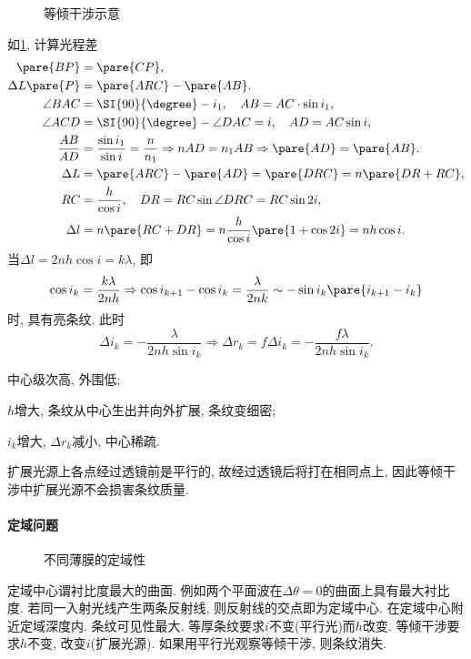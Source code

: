 \documentclass{ctexart}
\begin{document}
\begin{figure}[ht]
    \centering
    \caption{等倾干涉示意}
    \label{fig:等倾干涉示意}
\end{figure}
如\cref{fig:等倾干涉示意}, 计算光程差
\begin{align*}
    \pare{BP} &= \pare{CP}, \\
    \Delta L\pare{P} &= \pare{ARC} - \pare{AB}. \\
    \angle BAC &= \SI{90}{\degree} - i_1,\quad AB = AC\cdot\sin i_1,\\
    \angle ACD &= \SI{90}{\degree} - \angle DAC = i,\quad AD = AC\sin i, \\
    \frac{AB}{AD} &= \frac{\sin i_1}{\sin i} = \frac{n}{n_1}\Rightarrow nAD = n_1 AB \Rightarrow \pare{AD} = \pare{AB}. \\
    \Delta L &= \pare{ARC} - \pare{AD} = \pare{DRC} = n\pare{DR+RC},\\
    RC &= \frac{h}{\cos i},\quad DR = RC \sin \angle DRC = RC\sin 2i, \\
    \Delta l &= n\pare{RC + DR} = n\frac{h}{\cos i}\pare{1+\cos 2i} = nh\cos i.
\end{align*}
当$\Delta l = 2nh\cos i = k\lambda$, 即
\[ \cos i_k = \frac{k\lambda}{2nh} \Rightarrow \cos i_{k+1} - \cos i_k = \frac{\lambda}{2nk} \sim -\sin i_k \pare{i_{k+1} - i_k} \]
时, 具有亮条纹. 此时
\[ \Delta i_k = -\frac{\lambda}{2nh \sin i_k} \Rightarrow \Delta r_k = f\Delta i_k = -\frac{f\lambda}{2nh\sin i_k}. \]
\begin{cenum}
    \item 中心级次高, 外围低;
    \item $h$增大, 条纹从中心生出并向外扩展, 条纹变细密;
    \item $i_k$增大, $\Delta r_k$减小, 中心稀疏.
\end{cenum}
扩展光源上各点经过透镜前是平行的, 故经过透镜后将打在相同点上, 因此等倾干涉中扩展光源不会损害条纹质量.

\paragraph{定域问题} %
\label{par:定域问题}

\begin{figure}[ht]
    \centering
    \caption{不同薄膜的定域性}
\end{figure}
定域中心谓衬比度最大的曲面. 例如两个平面波在$\Delta\theta=0$的曲面上具有最大衬比度. 若同一入射光线产生两条反射线, 则反射线的交点即为定域中心. 在定域中心附近定域深度内. 条纹可见性最大. 等厚条纹要求$i$不变(平行光)而$h$改变. 等倾干涉要求$h$不变, 改变$i$(扩展光源). 如果用平行光观察等倾干涉, 则条纹消失.
\end{document}
